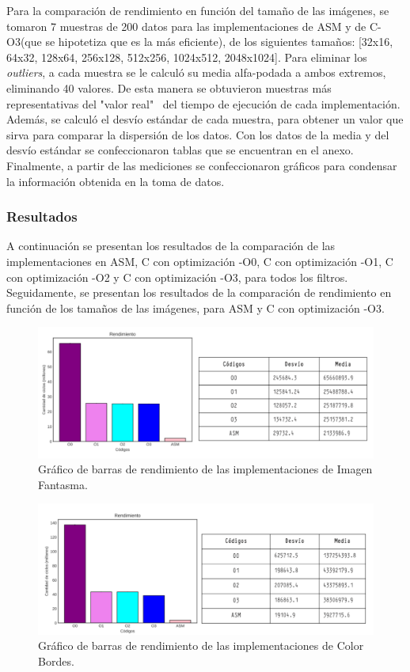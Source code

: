 \documentclass[a4paper]{article}
\begin{document}
\justify
Para la comparación de rendimiento en función del tamaño de las imágenes, se tomaron 7 muestras de 200 datos para las implementaciones de ASM y de C-O3(que se hipotetiza que es la más eficiente), de los siguientes tamaños: [32x16, 64x32, 128x64, 256x128, 512x256, 1024x512, 2048x1024].
\justify	
Para eliminar los \textit{outliers}, a cada muestra se le calculó su media alfa-podada a ambos extremos, eliminando 40 valores. De esta manera se obtuvieron muestras más representativas del "valor real" \ del tiempo de ejecución de cada implementación.
\justify 
Además, se calculó el desvío estándar de cada muestra, para obtener un valor que sirva para comparar la dispersión de los datos. Con los datos de la media y del desvío estándar se confeccionaron tablas que se encuentran en el anexo.
\justify 
Finalmente, a partir de las mediciones se confeccionaron gráficos para condensar la información obtenida en la toma de datos.
\subsubsection{Resultados}

\justify 
A continuación se presentan los resultados de la comparación de las implementaciones en ASM, C con optimización -O0, C con optimización -O1, C con optimización -O2 y C con optimización -O3, para todos los filtros.
Seguidamente, se presentan los resultados de la comparación de rendimiento en función de los tamaños de las imágenes, para ASM y C con optimización -O3.\\ 

\begin{figure}[h!]
	\includegraphics[scale=0.5]{img/ImagenFantasmaConTabla.pdf}
	\caption{Gráfico de barras de rendimiento de las implementaciones de Imagen Fantasma.}
\end{figure}	



\begin{figure}[h!]
	\includegraphics[scale=0.55]{img/ColorBordesConTabla.pdf}
	\caption{Gráfico de barras de rendimiento de las implementaciones de Color Bordes.}
\end{figure}	
\end{document}
